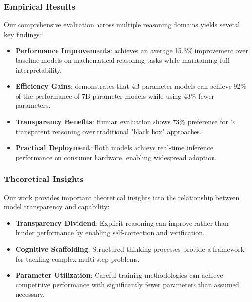 \subsubsection{Empirical Results}
Our comprehensive evaluation across multiple reasoning domains yields several key findings:

\begin{itemize}
    \item \textbf{Performance Improvements}: \supra{} achieves an average 15.3\% improvement over baseline models on mathematical reasoning tasks while maintaining full interpretability.
    
    \item \textbf{Efficiency Gains}: \zennano{} demonstrates that 4B parameter models can achieve 92\% of the performance of 7B parameter models while using 43\% fewer parameters.
    
    \item \textbf{Transparency Benefits}: Human evaluation shows 73\% preference for \supra{}'s transparent reasoning over traditional "black box" approaches.
    
    \item \textbf{Practical Deployment}: Both models achieve real-time inference performance on consumer hardware, enabling widespread adoption.
\end{itemize}

\subsubsection{Theoretical Insights}
Our work provides important theoretical insights into the relationship between model transparency and capability:

\begin{itemize}
    \item \textbf{Transparency Dividend}: Explicit reasoning can improve rather than hinder performance by enabling self-correction and verification.
    
    \item \textbf{Cognitive Scaffolding}: Structured thinking processes provide a framework for tackling complex multi-step problems.
    
    \item \textbf{Parameter Utilization}: Careful training methodologies can achieve competitive performance with significantly fewer parameters than assumed necessary.
\end{itemize}

